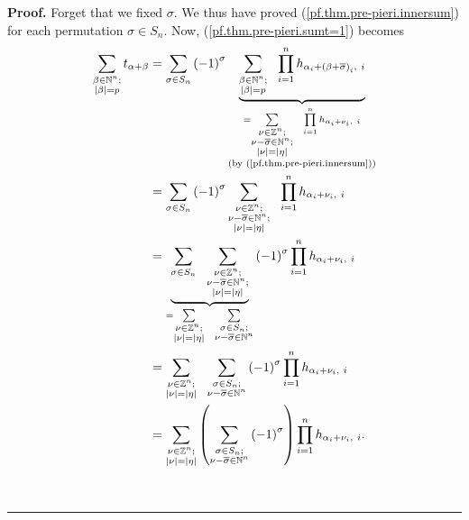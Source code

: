 \documentclass[numbers=enddot,12pt,final,onecolumn,notitlepage,english]{scrartcl}%
\theoremstyle{definition}
\newenvironment{proof}[1][Proof]{\noindent\textbf{#1.} }{\ \rule{0.5em}{0.5em}}
\let\sumnonlimits\sum
\let\prodnonlimits\prod
\renewcommand{\sum}{\sumnonlimits\limits}
\renewcommand{\prod}{\prodnonlimits\limits}
\newenvironment{verlong}{}{}
\begin{document}
\begin{verlong}
\begin{proof}
Forget that we fixed $\sigma$. We thus have proved
(\ref{pf.thm.pre-pieri.innersum}) for each permutation $\sigma\in S_{n}$. Now,
(\ref{pf.thm.pre-pieri.sumt=1}) becomes%
\begin{align}
\sum_{\substack{\beta\in\mathbb{N}^{n};\\\left\vert \beta\right\vert
=p}}t_{\alpha+\beta}  &  =\sum_{\sigma\in S_{n}}\left(  -1\right)  ^{\sigma
}\underbrace{\sum_{\substack{\beta\in\mathbb{N}^{n};\\\left\vert
\beta\right\vert =p}}\ \ \prod_{i=1}^{n}h_{\alpha_{i}+\left(  \beta
+\overline{\sigma}\right)  _{i},\ i}}_{\substack{=\sum_{\substack{\nu
\in\mathbb{Z}^{n};\\\nu-\overline{\sigma}\in\mathbb{N}^{n};\\\left\vert
\nu\right\vert =\left\vert \eta\right\vert }}\ \ \prod_{i=1}^{n}h_{\alpha
_{i}+\nu_{i},\ i}\\\text{(by (\ref{pf.thm.pre-pieri.innersum}))}}}\nonumber\\
&  =\sum_{\sigma\in S_{n}}\left(  -1\right)  ^{\sigma}\sum_{\substack{\nu
\in\mathbb{Z}^{n};\\\nu-\overline{\sigma}\in\mathbb{N}^{n};\\\left\vert
\nu\right\vert =\left\vert \eta\right\vert }}\ \ \prod_{i=1}^{n}h_{\alpha
_{i}+\nu_{i},\ i}\nonumber\\
&  =\underbrace{\sum_{\sigma\in S_{n}}\ \ \sum_{\substack{\nu\in\mathbb{Z}%
^{n};\\\nu-\overline{\sigma}\in\mathbb{N}^{n};\\\left\vert \nu\right\vert
=\left\vert \eta\right\vert }}}_{=\sum_{\substack{\nu\in\mathbb{Z}%
^{n};\\\left\vert \nu\right\vert =\left\vert \eta\right\vert }}\ \ \sum
_{\substack{\sigma\in S_{n};\\\nu-\overline{\sigma}\in\mathbb{N}^{n}}}}\left(
-1\right)  ^{\sigma}\prod_{i=1}^{n}h_{\alpha_{i}+\nu_{i},\ i}\nonumber\\
&  =\sum_{\substack{\nu\in\mathbb{Z}^{n};\\\left\vert \nu\right\vert
=\left\vert \eta\right\vert }}\ \ \sum_{\substack{\sigma\in S_{n}%
;\\\nu-\overline{\sigma}\in\mathbb{N}^{n}}}\left(  -1\right)  ^{\sigma}%
\prod_{i=1}^{n}h_{\alpha_{i}+\nu_{i},\ i}\nonumber\\
&  =\sum_{\substack{\nu\in\mathbb{Z}^{n};\\\left\vert \nu\right\vert
=\left\vert \eta\right\vert }}\left(  \sum_{\substack{\sigma\in S_{n}%
;\\\nu-\overline{\sigma}\in\mathbb{N}^{n}}}\left(  -1\right)  ^{\sigma
}\right)  \prod_{i=1}^{n}h_{\alpha_{i}+\nu_{i},\ i}.
\label{pf.thm.pre-pieri.2}%
\end{align}



\end{proof}
\end{verlong}
\end{document}

